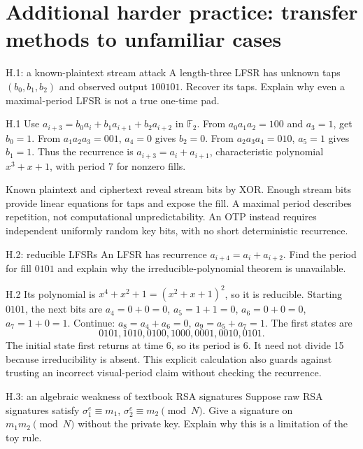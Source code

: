 \documentclass[11pt,a4paper]{article}
\newcommand{\F}{\mathbb F}\newcommand{\Z}{\mathbb Z}
\begin{document}
\section{Additional harder practice: transfer methods to unfamiliar cases}
\begin{question}{H.1: a known-plaintext stream attack}
A length-three LFSR has unknown taps \((b_0,b_1,b_2)\) and observed output \(100101\). Recover its taps. Explain why even a maximal-period LFSR is not a true one-time pad.
\end{question}
\begin{answer}{H.1}
Use \(a_{i+3}=b_0a_i+b_1a_{i+1}+b_2a_{i+2}\) in \(\F_2\). From \(a_0a_1a_2=100\) and \(a_3=1\), get \(b_0=1\). From \(a_1a_2a_3=001\), \(a_4=0\) gives \(b_2=0\). From \(a_2a_3a_4=010\), \(a_5=1\) gives \(b_1=1\). Thus the recurrence is \(a_{i+3}=a_i+a_{i+1}\), characteristic polynomial \(x^3+x+1\), with period 7 for nonzero fills.

Known plaintext and ciphertext reveal stream bits by XOR. Enough stream bits provide linear equations for taps and expose the fill. A maximal period describes repetition, not computational unpredictability. An OTP instead requires independent uniformly random key bits, with no short deterministic recurrence.
\end{answer}
\begin{question}{H.2: reducible LFSRs}
An LFSR has recurrence \(a_{i+4}=a_i+a_{i+2}\). Find the period for fill \(0101\) and explain why the irreducible-polynomial theorem is unavailable.
\end{question}
\begin{answer}{H.2}
Its polynomial is \(x^4+x^2+1=(x^2+x+1)^2\), so it is reducible. Starting \(0101\), the next bits are \(a_4=0+0=0\), \(a_5=1+1=0\), \(a_6=0+0=0\), \(a_7=1+0=1\). Continue: \(a_8=a_4+a_6=0\), \(a_9=a_5+a_7=1\). The first states are
\[0101,1010,0100,1000,0001,0010,0101.\]
The initial state first returns at time 6, so its period is 6. It need not divide 15 because irreducibility is absent. This explicit calculation also guards against trusting an incorrect visual-period claim without checking the recurrence.
\end{answer}
\begin{question}{H.3: an algebraic weakness of textbook RSA signatures}
Suppose raw RSA signatures satisfy \(\sigma_1^e\equiv m_1\), \(\sigma_2^e\equiv m_2\pmod N\). Give a signature on \(m_1m_2\pmod N\) without the private key. Explain why this is a limitation of the toy rule.
\end{question}
\end{document}
